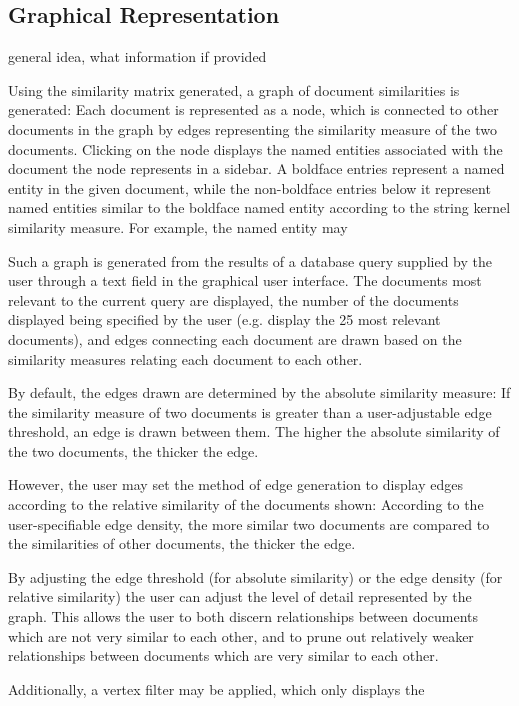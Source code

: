 \subsection {Graphical Representation}
\label{sec:graphical_representation}
\note general idea, what information if provided

Using the similarity matrix generated, a graph of document similarities is generated: Each document is represented as a node, which is connected to other documents in the graph by edges representing the similarity measure of the two documents. Clicking on the node displays the named entities associated with the document the node represents in a sidebar. A boldface entries represent a named entity in the given document, while the non-boldface entries below it represent named entities similar to the boldface named entity according to the string kernel similarity measure. For example, the named entity  may

Such a graph is generated from the results of a database query supplied by the user through a text field in the graphical user interface. The documents most relevant to the current query are displayed, the number of the documents displayed being specified by the user (e.g. display the 25 most relevant documents), and edges connecting each document are drawn based on the similarity measures relating each document to each other.

By default, the edges drawn are determined by the absolute similarity measure: If the similarity measure of two documents is greater than a user-adjustable edge threshold, an edge is drawn between them. The higher the absolute similarity of the two documents, the thicker the edge.

However, the user may set the method of edge generation to display edges according to the relative similarity of the documents shown: According to the user-specifiable edge density, the more similar two documents are compared to the similarities of other documents, the thicker the edge.

By adjusting the edge threshold (for absolute similarity) or the edge density (for relative similarity) the user can adjust the level of detail represented by the graph. This allows the user to both discern relationships between documents which are not very similar to each other, and to prune out relatively weaker relationships between documents which are very similar to each other.

Additionally, a vertex filter may be applied, which only displays the